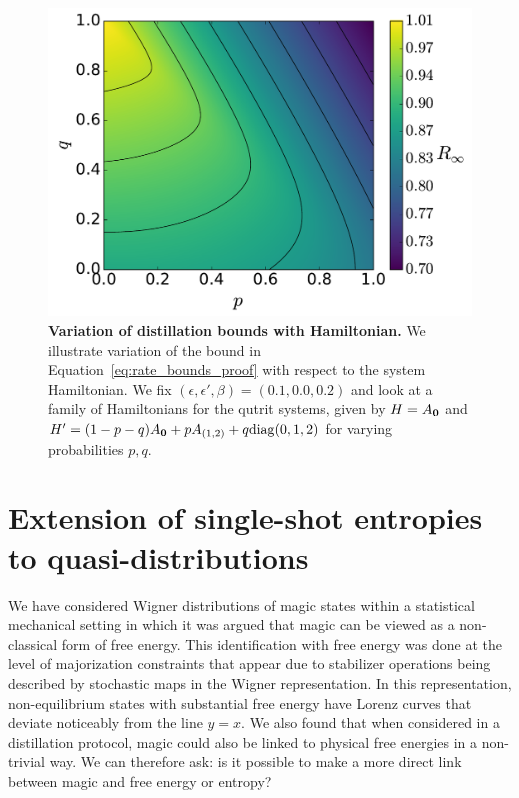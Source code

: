 \documentclass[pra,
aps,
twocolumn,
superscriptaddress,
groupedaddress,
nofootinbib,
reprint
]{revtex4-1}
\begin{document}
\begin{figure}
    \centering
    \includegraphics[scale=0.35]{figs/R_vs_A.pdf}
    \caption{\textbf{Variation of distillation bounds with Hamiltonian.}  We illustrate variation of the bound in Equation~\ref{eq:rate_bounds_proof} with respect to the system Hamiltonian. We fix $(\epsilon, \epsilon', \beta) = (0.1, 0.0, 0.2)$ and look at a family of Hamiltonians for the qutrit systems, given by $H = A_{\bm{0}}$ and $H' = (1-p-q)A_{\bm{0}}+pA_{(1,2)}+q{\rm{diag}}(0,1,2)$ for varying probabilities $p, q$. 
    }
    \label{fig:rvsa}
\end{figure}

\section{Extension of single-shot entropies to quasi-distributions}\label{section:entropies}
We have considered Wigner distributions of magic states within a statistical mechanical setting in which it was argued that magic can be viewed as a non-classical form of free energy. This identification with free energy was done at the level of majorization constraints that appear due to stabilizer operations being described by stochastic maps in the Wigner representation. In this representation, non-equilibrium states with substantial free energy have Lorenz curves that deviate noticeably from the line $y=x$. We also found that when considered in a distillation protocol, magic could also be linked to physical free energies in a non-trivial way. We can therefore ask: is it possible to make a more direct link between magic and free energy or entropy?
\end{document}
